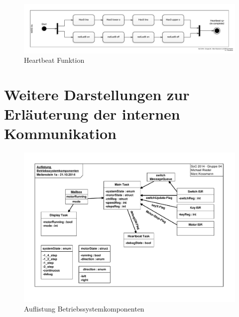 \documentclass[ngerman,fontsize=12pt , paper=a4 , twoside=false , DIV12 , BCOR=1cm ,
numbers=enddot , listof=totoc , bibliography=totoc , index=totoc ,
headings=small , headlines=1.5 , final]{scrbook}
\begin{document}
\begin{figure}[htbp]
\centering
\includegraphics{../Diagrams/Activities/Functions/Heartbeat.pdf}
\caption{Heartbeat Funktion\label{fig:heartbeat}}
\end{figure}

\newpage

\chapter{Weitere Darstellungen zur Erläuterung der internen
Kommunikation}\label{weitere-darstellungen-zur-erluxe4uterung-der-internen-kommunikation}

\begin{figure}[htbp]
\centering
\includegraphics{../Diagrams/Auflistung_Betriebssystemkomponenten.pdf}
\caption{Auflistung Betriebssystemkomponenten\label{fig:auflistung}}
\end{figure}
\end{document}
